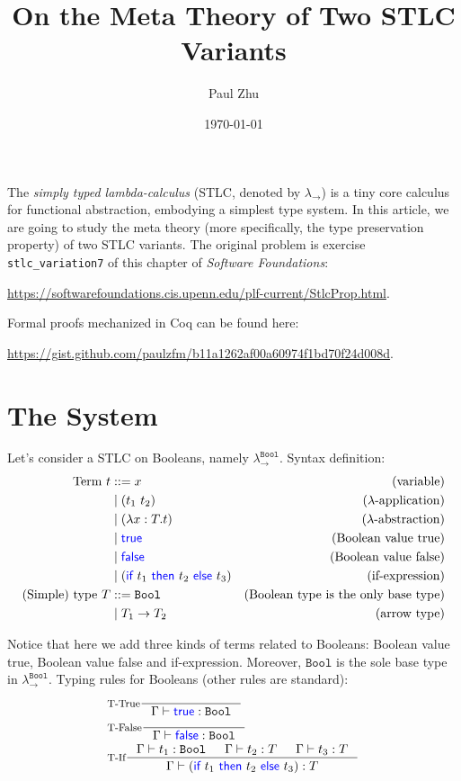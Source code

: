 \documentclass[11pt]{article}
\title{\textbf{On the Meta Theory of Two STLC Variants}}
\author{Paul Zhu}
\date{\today}
\let\t\texttt
\let\to\rightarrow
\newcommand{\Bool}{\t{Bool}}
\newcommand{\kword}[1]{{\color{blue} \textsf{#1}}}
\newcommand{\True}{\kword{true}}
\newcommand{\False}{\kword{false}}
\newcommand{\If}{\kword{if}}
\newcommand{\Then}{\kword{then}}
\newcommand{\Else}{\kword{else}}
\begin{document}
\maketitle

The \emph{simply typed lambda-calculus} (STLC, denoted by $\lambda_\to$) is a tiny core calculus for functional abstraction, embodying a simplest type system.
In this article, we are going to study the meta theory (more specifically, the type preservation property) of two STLC variants.
The original problem is exercise \t{stlc\_variation7} of this chapter of \emph{Software Foundations}:
\begin{center}
    \url{https://softwarefoundations.cis.upenn.edu/plf-current/StlcProp.html}.    
\end{center}
Formal proofs mechanized in Coq can be found here:
\begin{center}
    \url{https://gist.github.com/paulzfm/b11a1262af00a60974f1bd70f24d008d}.
\end{center}

\section{The System}

Let's consider a STLC on Booleans, namely $\lambda_\to^{\Bool}$.
Syntax definition:
\begin{align*}
    \text{Term}~t &::= x & \text{(variable)} \\
    &\mid (t_1~t_2) & \text{($\lambda$-application)} \\
    &\mid (\lambda x:T.t) & \text{($\lambda$-abstraction)} \\
    &\mid \True & \text{(Boolean value true)} \\
    &\mid \False & \text{(Boolean value false)} \\
    &\mid (\If~t_1~\Then~t_2~\Else~t_3) & \text{(if-expression)} \\
    \text{(Simple) type}~T &::= \Bool & \text{(Boolean type is the only base type)} \\
    &\mid T_1\to T_2 & \text{(arrow type)}
\end{align*}

Notice that here we add three kinds of terms related to Booleans: Boolean value true, Boolean value false and if-expression.
Moreover, $\Bool$ is the sole base type in $\lambda_\to^{\Bool}$.
Typing rules for Booleans (other rules are standard):
\begin{align*}
    & \inference[T-True]{}{\Gamma \vdash \True:\Bool} \\
    & \inference[T-False]{}{\Gamma \vdash \False:\Bool} \\
    & \inference[T-If]{\Gamma \vdash t_1:\Bool & \Gamma \vdash t_2:T & \Gamma \vdash t_3:T}{\Gamma \vdash (\If~t_1~\Then~t_2~\Else~t_3):T}
\end{align*}
\end{document}
